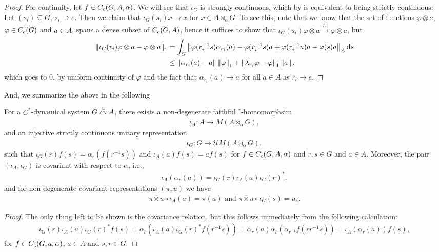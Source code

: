 \begin{proof}
For continuity, let $f \in C_c(G,A,\alpha)$. We will see that $\iota_G$ is strongly continuous, which by  is equivalent to being strictly continuous: Let $(s_i)\subseteq G$, $s_i \to e$. Then we claim that $\iota_G(s_i) x \to x$ for $x \in A \rtimes_\alpha G$. To see this, note that we know that the set of functions $\varphi \otimes a$, $\varphi \in C_c(G)$ and $a \in A$, spans a dense subset of $C_c(G,A)$, hence it suffices to show that $\iota_G(s_i) \varphi \otimes a \stackrel{L^1}{\to} \varphi \otimes a$, but
\begin{align*}
	\left\lVert \iota_G(r_{i}) \varphi \otimes a - \varphi \otimes a \right\rVert_1 &= \int_G \left\lVert \varphi(r_{i}^{-1}s) \alpha_{r_i}(a) - \varphi(r_i^{-1}s) a + \varphi(r_{i}^{-1}a) a - \varphi(s) a \right\rVert_A \mathrm{d} s\\ 
	& \leq \left\lVert \alpha_{r_i}(a) - a \right\rVert \left\lVert \varphi \right\rVert_1 + \left\lVert \lambda_{r_i} \varphi - \varphi \right\rVert_1 \left\lVert a \right\rVert,
\end{align*}
which goes to $0$, by uniform continuity of $\varphi$ and the fact that $\alpha_{r_i}(a) \to a$ for all $ a\in A$ as $r_i \to e$.
\end{proof}
And, we summarize the above in the following
\begin{proposition}
For a $C^*$-dynamical system $G \stackrel{\alpha}{\curvearrowright} A$, there exists a non-degenerate faithful $^*$-homomorphsim 
\begin{align*}
\iota_A \colon A \to M(A \rtimes_\alpha G),	
\end{align*}
and an injective strictly continuous unitary representation 
\begin{align*}
	\iota_G \colon G \to \mathcal{U}M(A \rtimes_\alpha G),
\end{align*}
such that $\iota_G(r) f(s) = \alpha_r(f(r^{-1}s))$  and $\iota_A(a) f(s) = af(s)$ for $f \in C_c(G,A,\alpha)$ and $r,s \in G$ and $a \in A$. Moreover, the pair $(\iota_A,\iota_G)$ is covariant with respect to $\alpha$, i.e., 
\begin{align*}
	\iota_A(\alpha_r (a) ) = \iota_G(r)  \iota_A(a) \iota_G(r)^*,
\end{align*}
and for non-degenerate covariant representations $(\pi,u)$ we have
\begin{align*}
	\overline{\pi \rtimes u} \circ \iota_A(a) = \pi(a) \text{ and } \overline{\pi \rtimes u } \circ \iota_G (s) = u_s.
\end{align*}
\label{cross:iotaprop}
\end{proposition}
\begin{proof}
The only thing left to be shown is the covariance relation, but this follows immediately from the following calculation:
\begin{align*}
	\iota_G(r) \iota_A(a) \iota_G(r)^* f(s) = \alpha_r(\iota_A(a) \iota_G(r)^{*}f(r^{-1}s)) = \alpha_r(a) \alpha_r ( \alpha_{r^{-1}}f(r r^{-1}s))= \iota_A(\alpha_r(a)) f(s),
\end{align*}
for $f \in C_c(G,a,\alpha)$, $a \in A$ and $s,r \in G$.
\end{proof}
